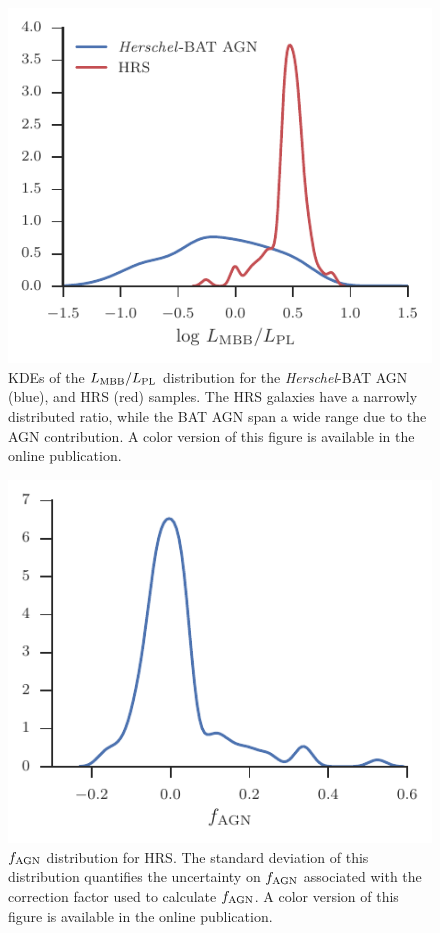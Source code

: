 \documentclass[fleqn, usenatbib]{mnras}
\newcommand{\herschel}{\emph{Herschel}}
\begin{document}
\begin{figure}
\includegraphics[width=\columnwidth]{figures/lmbb-lpl-ratio-hrs-mass-select}
\caption{KDEs of the $L_{\rm MBB}/L_{\rm PL}$ distribution for the \herschel-BAT AGN (blue), and HRS (red) samples. The HRS galaxies have a narrowly distributed ratio, while the BAT AGN span a wide range due to the AGN contribution. A color version of this figure is available in the online publication. \label{fig:lmbb_lpl_ratio}}
\end{figure}

\begin{figure}
\includegraphics[width=\columnwidth]{figures/fagn_nonAGN_hrs_mass_select}
\caption{$f_{\rm AGN}$ distribution for HRS. The standard deviation of this distribution quantifies the uncertainty on $f_{\rm AGN}$ associated with the correction factor used to calculate $f_{\rm AGN}$. A color version of this figure is available in the online publication. \label{fig:fagn_nonAGN}}
\end{figure}
\end{document}

